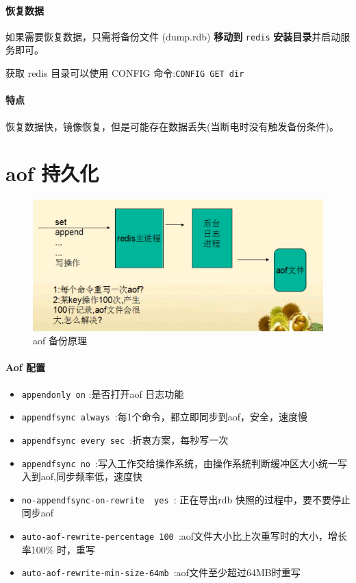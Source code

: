 \documentclass[UTF8,a4paper,12pt]{ctexbook}
\begin{document}
		\paragraph{恢复数据}
			如果需要恢复数据，只需将备份文件 (dump.rdb) \textbf{移动到} \verb|redis| \textbf{安装目录}并启动服务即可。
			
			获取 redis 目录可以使用 CONFIG 命令:\verb|CONFIG GET dir|
	
		\paragraph{特点}
			恢复数据快，镜像恢复，但是可能存在数据丢失(当断电时没有触发备份条件)。
		
	\section{aof 持久化}
		\begin{figure}[H]
			\centering
			\includegraphics[scale=0.9]{rof}
			\caption{aof 备份原理}
		\end{figure}

		\paragraph{Aof 配置}
			\begin{itemize}
				\item \verb|appendonly on| :是否打开aof 日志功能
				\item \verb|appendfsync always |:每1个命令，都立即同步到aof，安全，速度慢
				\item \verb|appendfsync every sec |:折衷方案，每秒写一次
				\item \verb|appendfsync no |:写入工作交给操作系统，由操作系统判断缓冲区大小统一写入到aof,同步频率低，速度快
				\item \verb|no-appendfsync-on-rewrite  yes |: 正在导出rdb 快照的过程中，要不要停止同步aof
				\item \verb|auto-aof-rewrite-percentage 100 |:aof文件大小比上次重写时的大小，增长率100\% 时，重写
				\item \verb|auto-aof-rewrite-min-size-64mb |:aof文件至少超过64MB时重写
			\end{itemize}
		
\end{document}
